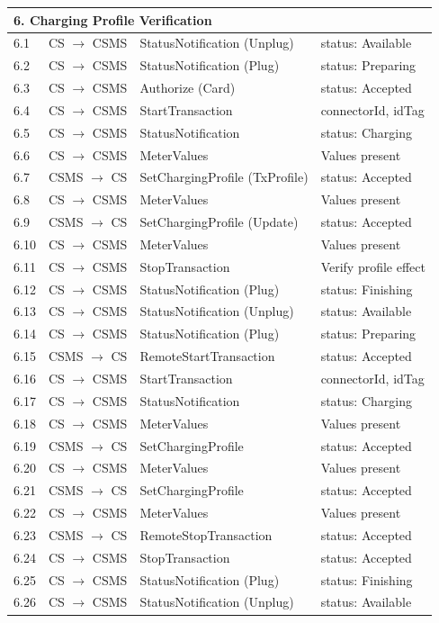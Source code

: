 \documentclass[a4paper,11pt]{report}
\begin{document}
\begin{footnotesize}
\begin{longtable}{|p{1.2cm}|p{2.5cm}|p{5.5cm}|p{6cm}|}
\multicolumn{4}{|l|}{\textbf{6. Charging Profile Verification}} \\
\hline
6.1 & CS $\to$ CSMS & StatusNotification (Unplug) & status: Available \\
\hline
6.2 & CS $\to$ CSMS & StatusNotification (Plug) & status: Preparing \\
\hline
6.3 & CS $\to$ CSMS & Authorize (Card) & status: Accepted \\
\hline
6.4 & CS $\to$ CSMS & StartTransaction & connectorId, idTag \\
\hline
6.5 & CS $\to$ CSMS & StatusNotification & status: Charging \\
\hline
6.6 & CS $\to$ CSMS & MeterValues & Values present \\
\hline
6.7 & CSMS $\to$ CS & SetChargingProfile (TxProfile) & status: Accepted \\
\hline
6.8 & CS $\to$ CSMS & MeterValues & Values present \\
\hline
6.9 & CSMS $\to$ CS & SetChargingProfile (Update) & status: Accepted \\
\hline
6.10 & CS $\to$ CSMS & MeterValues & Values present \\
\hline
6.11 & CS $\to$ CSMS & StopTransaction & Verify profile effect \\
\hline
6.12 & CS $\to$ CSMS & StatusNotification (Plug) & status: Finishing \\
\hline
6.13 & CS $\to$ CSMS & StatusNotification (Unplug) & status: Available \\
\hline
6.14 & CS $\to$ CSMS & StatusNotification (Plug) & status: Preparing \\
\hline
6.15 & CSMS $\to$ CS & RemoteStartTransaction & status: Accepted \\
\hline
6.16 & CS $\to$ CSMS & StartTransaction & connectorId, idTag \\
\hline
6.17 & CS $\to$ CSMS & StatusNotification & status: Charging \\
\hline
6.18 & CS $\to$ CSMS & MeterValues & Values present \\
\hline
6.19 & CSMS $\to$ CS & SetChargingProfile & status: Accepted \\
\hline
6.20 & CS $\to$ CSMS & MeterValues & Values present \\
\hline
6.21 & CSMS $\to$ CS & SetChargingProfile & status: Accepted \\
\hline
6.22 & CS $\to$ CSMS & MeterValues & Values present \\
\hline
6.23 & CSMS $\to$ CS & RemoteStopTransaction & status: Accepted \\
\hline
6.24 & CS $\to$ CSMS & StopTransaction & status: Accepted \\
\hline
6.25 & CS $\to$ CSMS & StatusNotification (Plug) & status: Finishing \\
\hline
6.26 & CS $\to$ CSMS & StatusNotification (Unplug) & status: Available \\
\hline


\end{longtable}
\end{footnotesize}
\end{document}
